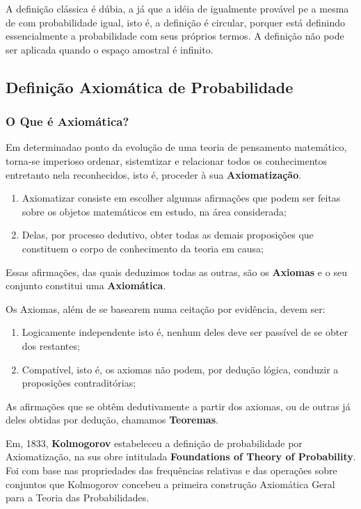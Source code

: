 \inic A definição clássica é dúbia, a já que a idéia de igualmente provável pe a mesma de com probabilidade igual, isto é, a definição é circular, porquer está definindo essencialmente a probabilidade com seus próprios termos. A definição não pode ser aplicada quando o espaço amostral é infinito.


 
\subsection{Definição Axiomática de Probabilidade}
\subsubsection{O Que é Axiomática?}

\inic Em determinadao ponto da evolução de uma teoria de pensamento matemático, torna-se imperioso ordenar, sistemtizar e relacionar todos os conhecimentos entretanto nela reconhecidos, isto é, proceder à sua \textbf{Axiomatização}. 
 
\begin{enumerate}
\item Axiomatizar consiste em escolher algumas afirmações que podem ser feitas sobre os objetos matemáticos em estudo, na área considerada;
\item Delas, por processo dedutivo, obter todas as demais proposições que constituem o corpo de conhecimento da teoria em causa;
\end{enumerate} 

\inic Essas afirmações, das quais deduzimos todas as outras, são os \textbf{Axiomas} e o seu conjunto constitui uma \textbf{Axiomática}.\vskip0.3cm
 

\inic Os Axiomas, além de se basearem numa ceitação por evidência, devem ser:

\begin{enumerate}
    \item Logicamente independente isto é, nenhum deles deve ser passível de se obter dos restantes;
    \item Compatível, isto é, os axiomas não podem, por dedução lógica, conduzir a proposições contraditórias; 
\end{enumerate}
 
 \inic As afirmações que se obtêm dedutivamente a partir dos axiomas, ou de outras já deles obtidas por dedução, chamamos \textbf{Teoremas}.\vskip0.3cm
 
 \inic Em, 1833, \textbf{Kolmogorov} estabeleceu a definição de probabilidade por Axiomatização, na sus obre intitulada \textbf{Foundations of Theory of Probability}. Foi com base nas propriedades das frequências relativas e das operações sobre conjuntos que Kolmogorov concebeu a primeira construção Axiomática Geral para a Teoria das Probabilidades.\vskip0.3cm


